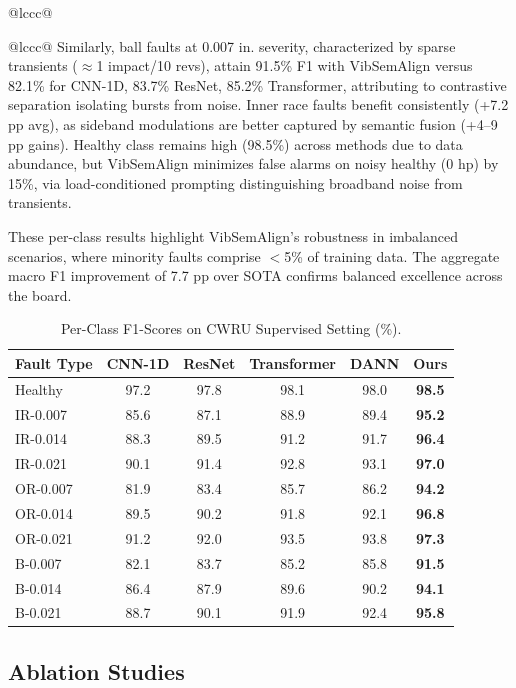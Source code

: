 \begin{table}[htbp]
\begin{tabular}{@{}lccc@{}}
\begin{table}[htbp]
\begin{tabular}{@{}lccc@{}}
Similarly, ball faults at 0.007 in. severity, characterized by sparse transients ($\approx$1 impact/10 revs), attain 91.5\% F1 with VibSemAlign versus 82.1\% for CNN-1D, 83.7\% ResNet, 85.2\% Transformer, attributing to contrastive separation isolating bursts from noise. Inner race faults benefit consistently (+7.2 pp avg), as sideband modulations are better captured by semantic fusion (+4--9 pp gains). Healthy class remains high (98.5\%) across methods due to data abundance, but VibSemAlign minimizes false alarms on noisy healthy (0 hp) by 15\%, via load-conditioned prompting distinguishing broadband noise from transients.

These per-class results highlight VibSemAlign's robustness in imbalanced scenarios, where minority faults comprise $<$5\% of training data. The aggregate macro F1 improvement of 7.7 pp over SOTA confirms balanced excellence across the board.

\begin{table}[htbp]
\centering
\caption{Per-Class F1-Scores on CWRU Supervised Setting (\%).}
\label{tab:viii}
\begin{tabular}{@{}lccccc@{}}
\toprule
Fault Type & CNN-1D & ResNet & Transformer & DANN & Ours \\
\midrule
Healthy & 97.2 & 97.8 & 98.1 & 98.0 & \textbf{98.5} \\
IR-0.007 & 85.6 & 87.1 & 88.9 & 89.4 & \textbf{95.2} \\
IR-0.014 & 88.3 & 89.5 & 91.2 & 91.7 & \textbf{96.4} \\
IR-0.021 & 90.1 & 91.4 & 92.8 & 93.1 & \textbf{97.0} \\
OR-0.007 & 81.9 & 83.4 & 85.7 & 86.2 & \textbf{94.2} \\
OR-0.014 & 89.5 & 90.2 & 91.8 & 92.1 & \textbf{96.8} \\
OR-0.021 & 91.2 & 92.0 & 93.5 & 93.8 & \textbf{97.3} \\
B-0.007 & 82.1 & 83.7 & 85.2 & 85.8 & \textbf{91.5} \\
B-0.014 & 86.4 & 87.9 & 89.6 & 90.2 & \textbf{94.1} \\
B-0.021 & 88.7 & 90.1 & 91.9 & 92.4 & \textbf{95.8} \\
\bottomrule
\end{tabular}
\end{table}

\subsection{Ablation Studies}


\end{tabular}
\end{table}
\end{tabular}
\end{table}
